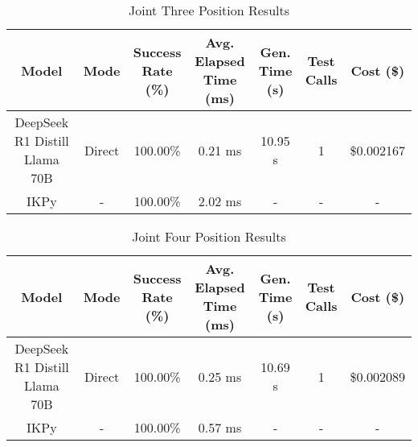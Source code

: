 \begin{landscape}
\begin{table}[H]
\tiny
\renewcommand{\arraystretch}{1.2}
\caption{Joint Three Position Results}
\begin{center}
\begin{tabular}{|c|c|c|c|c|c|c|}
    \hline
    \textbf{Model} & 
    \textbf{Mode} & 
    \makecell{\textbf{Success}\\\textbf{Rate (\%)}} &
    \makecell{\textbf{Avg. Elapsed}\\\textbf{Time (ms)}} &
    \makecell{\textbf{Gen.}\\\textbf{Time (s)}} &
    \makecell{\textbf{Test}\\\textbf{Calls}} &
    \textbf{Cost (\$)} \\
    \hline
    DeepSeek R1 Distill Llama 70B & Direct & 100.00\% & 0.21 ms & 10.95 s & 1 & \$0.002167 \\
    \hline
    IKPy & - & 100.00\% & 2.02 ms & - & - & - \\
    \hline
\end{tabular}
\label{Results-Position-3-3}
\end{center}
\end{table}

\begin{table}[H]
\tiny
\renewcommand{\arraystretch}{1.2}
\caption{Joint Four Position Results}
\begin{center}
\begin{tabular}{|c|c|c|c|c|c|c|}
    \hline
    \textbf{Model} & 
    \textbf{Mode} & 
    \makecell{\textbf{Success}\\\textbf{Rate (\%)}} &
    \makecell{\textbf{Avg. Elapsed}\\\textbf{Time (ms)}} &
    \makecell{\textbf{Gen.}\\\textbf{Time (s)}} &
    \makecell{\textbf{Test}\\\textbf{Calls}} &
    \textbf{Cost (\$)} \\
    \hline
    DeepSeek R1 Distill Llama 70B & Direct & 100.00\% & 0.25 ms & 10.69 s & 1 & \$0.002089 \\
    \hline
    IKPy & - & 100.00\% & 0.57 ms & - & - & - \\
    \hline
\end{tabular}
\label{Results-Position-4-4}
\end{center}
\end{table}


\end{landscape}
